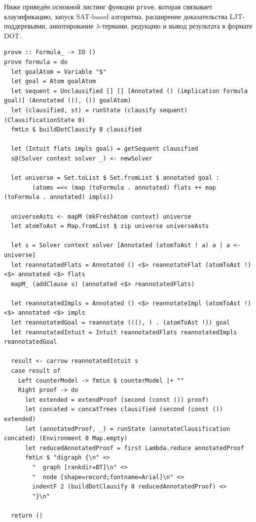\documentclass[14pt, russian]{scrartcl}
\begin{document}
Ниже приведён основной листинг функции \texttt{prove}, которая связывает
клаузификацию, запуск SAT-based алгоритма, расширение доказательства
LJT-поддеревьями, аннотирование $\lambda$-термами, редукцию и вывод
результата в формате DOT.

\begin{listing}[!htb]
\caption{Функция \texttt{prove}: общий конвейер доказательства}
\label{lst:refactoring-prove-pipeline}
\begin{verbatim}
prove :: Formula_ -> IO ()
prove formula = do
  let goalAtom = Variable "$"
  let goal = Atom goalAtom
  let sequent = Unclausified [] [] [Annotated () (implication formula goal)] (Annotated ((), ()) goalAtom)
  let (clausified, st) = runState (clausify sequent) (ClausificationState 0)
  fmtLn $ buildDotClausify 0 clausified

  let (Intuit flats impls goal) = getSequent clausified
  s@(Solver context solver _) <- newSolver

  let universe = Set.toList $ Set.fromList $ annotated goal :
        (atoms =<< (map (toFormula . annotated) flats ++ map (toFormula . annotated) impls))

  universeAsts <- mapM (mkFreshAtom context) universe
  let atomToAst = Map.fromList $ zip universe universeAsts

  let s = Solver context solver [Annotated (atomToAst ! a) a | a <- universe]
  let reannotatedFlats = Annotated () <$> reannotateFlat (atomToAst !) <$> annotated <$> flats
  mapM_ (addClause s) (annotated <$> reannotatedFlats)

  let reannotatedImpls = Annotated () <$> reannotateImpl (atomToAst !) <$> annotated <$> impls
  let reannotatedGoal = reannotate (((), ) . (atomToAst !)) goal
  let reannotatedIntuit = Intuit reannotatedFlats reannotatedImpls reannotatedGoal

  result <- carrow reannotatedIntuit s
  case result of
    Left counterModel -> fmtLn $ counterModel |+ ""
    Right proof -> do
      let extended = extendProof (second (const ()) proof)
      let concated = concatTrees clausified (second (const ()) extended)
      let (annotatedProof, _) = runState (annotateClausification concated) (Environment 0 Map.empty)
      let reducedAnnotatedProof = first Lambda.reduce annotatedProof
      fmtLn $ "digraph {\n" <>
        "  graph [rankdir=BT]\n" <>
        "  node [shape=record;fontname=Arial]\n" <>
        indentF 2 (buildDotClausify 0 reducedAnnotatedProof) <>
        "}\n"

  return ()
\end{verbatim}
\end{listing}
\end{document}
